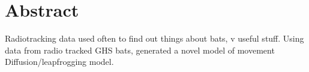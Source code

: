 \section{Abstract}

Radiotracking data used often to find out things about bats, v useful stuff.
Using data from radio tracked GHS bats, generated a novel model of movement
Diffusion/leapfrogging model.
